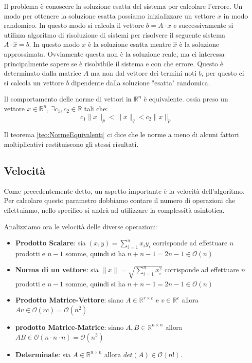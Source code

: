 Il problema è conoscere la soluzione esatta del sistema per calcolare l'errore.
Un modo per ottenere la soluzione esatta possiamo inizializzare un vettore $x$ in modo
randomico. In questo modo si calcola il vettore $b =A\cdot x $ e successivamente
si utilizza algoritmo di risoluzione di sistemi per risolvere il seguente
sistema $A\cdot \stackrel{\sim}{x} = b$. In questo modo $x$ è la soluzione esatta
mentre  $\stackrel{\sim}{x}$ è la soluzione approssimata. Ovviamente questa non è
la soluzione reale, ma ci interessa principalmente sapere se è risolvibile il sistema
e con che errore. Questo è determinato dalla matrice $A$ ma non dal vettore dei
termini noti $b$, per questo ci si calcola un vettore $b$ dipendente dalla soluzione
"esatta" randomica.
\begin{teorema}\label{teo:NormeEquivalenti}
    Il comportamento delle norme di vettori in $\mathbb{R}^n$ è equivalente. ossia
    preso un vettore $x\in \mathbb{R}^n$, $\exists c_1,c_2\in \mathbb{R}$ tali che:
    \begin{equation}
        c_1\|x\|_p < \|x\|_q < c_2\|x\|_p
    \end{equation}
\end{teorema}
Il teorema \ref{teo:NormeEquivalenti} ci dice che le norme a meno di alcuni
fattori moltiplicativi restituiscono gli stessi risultati.
\subsection{Velocità}
Come precedentemente detto, un aspetto importante è la velocità dell'algoritmo.
Per calcolare questo parametro dobbiamo contare il numero di operazioni che
effettuiamo, nello specifico si andrà ad utilizzare la complessità asintotica.

Analizziamo ora le velocità delle diverse operazioni:
\begin{itemize}
    \item \textbf{Prodotto Scalare}: sia $(x,y) = \sum_{i=1}^n x_iy_i$ corrisponde
          ad effettuare $n$ prodotti e $n-1$ somme, quindi si ha $n + n - 1 = 2
              n -1 \in \mathcal{O}(n)$
    \item \textbf{Norma di un vettore}: sia $\|x\| = \sqrt{\sum_{i=1}^n x_i^2}$
          corrisponde ad effettuare $n$ prodotti e $n-1$ somme, quindi si ha
          $n + n - 1 = 2n -1 \in \mathcal{O}(n)$
    \item \textbf{Prodotto Matrice-Vettore}: siano $A\in \mathbb{R}^{r\times c}$
          e $v\in \mathbb{R}^c$ allora $Av\in \mathcal{O} (rc) = \mathcal{O}(n^2)$
    \item \textbf{prodotto Matrice-Matrice}: siano $A,B\in \mathbb{R}^{n\times n}$
          allora $AB\in \mathcal{O} (n \cdot n \cdot n) = \mathcal{O} (n^3)$
    \item \textbf{Determinate}: sia $A\in \mathbb{R}^{n\times n}$ allora
          $det(A) \in \mathcal{O}(n!)$.
\end{itemize}
